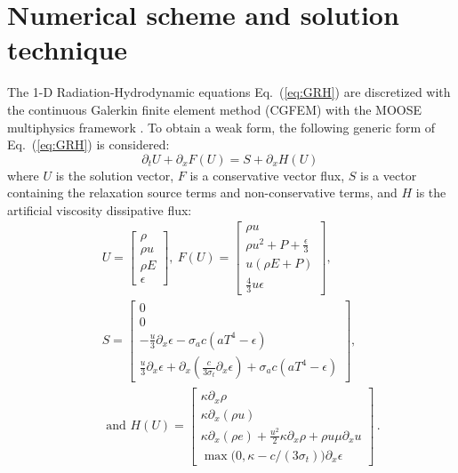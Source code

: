 \documentclass[review]{elsarticle}
\newcommand{\eqt}[1]{Eq.~(\ref{#1})}                     %
\begin{document}
\section{Numerical scheme and solution technique}
\label{sec:num-scheme}

The 1-D Radiation-Hydrodynamic equations \eqt{eq:GRH} are discretized with the continuous Galerkin finite element method (CGFEM) with the MOOSE multiphysics framework \cite{Moose}. To obtain a weak form, the following generic form of \eqt{eq:GRH} is considered:
\begin{equation}
\label{eq:form}
\partial_t U + \partial_x F \left( U \right) = S + \partial_x H \left(U\right) \,
\end{equation}
where $U$ is the solution vector, $F$ is a conservative vector flux, $S$ is a vector containing the relaxation source terms and non-conservative terms, and $H$ is the artificial viscosity dissipative flux:
\begin{eqnarray*}
&&U = 
\begin{bmatrix}
\rho \\
\rho u \\
\rho E \\
\epsilon
\end{bmatrix}
,\
F(U) = 
\begin{bmatrix}
\rho u \\
\rho u^2 + P + \frac{\epsilon}{3} \\
u \left( \rho E + P \right) \\
\frac{4}{3} u \epsilon
\end{bmatrix}
,\ \\
&&S = 
\begin{bmatrix}
0 \\
0 \\
-\frac{u}{3} \partial_x \epsilon - \sigma_a c \left( a T^4 - \epsilon \right) \\
\frac{u}{3} \partial_x \epsilon + \partial_x \left( \frac{c}{3 \sigma_t} \partial_x \epsilon \right) + \sigma_a c \left( a T^4 - \epsilon \right)
\end{bmatrix}
,
\\
&&\text{ and } 
H(U) = 
\begin{bmatrix}
\kappa \partial_x \rho \\
\kappa \partial_x (\rho u) \\
\kappa \partial_x \left( \rho e \right) + \frac{u^2}{2} \kappa \partial_x \rho + \rho u \mu \partial_x u \\
\max \big( 0, \kappa- c/(3 \sigma_t) \big) \partial_x \epsilon 
\end{bmatrix} \,.
\end{eqnarray*}
\end{document}
